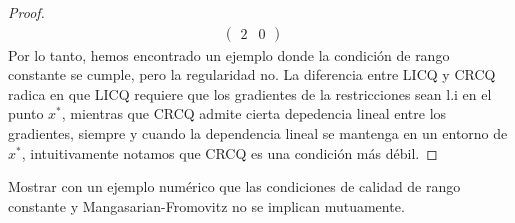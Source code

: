 \documentclass{article}
\newenvironment{theorem}[2][Ejercicio]{\begin{trivlist}
\item[\hskip \labelsep {\bfseries #1}\hskip \labelsep {\bfseries #2.}]}{\end{trivlist}}
\begin{document}
\begin{proof}
\begin{align*}
        \begin{pmatrix}
            2 & 0
        \end{pmatrix} \quad
    \end{align*}
    Por lo tanto, hemos encontrado un ejemplo donde la condición de rango constante se cumple, pero la regularidad no. La diferencia entre LICQ y CRCQ radica en que LICQ requiere que los gradientes de la restricciones sean l.i en el punto \( x^* \),
    mientras que CRCQ admite cierta depedencia lineal entre los gradientes, siempre y cuando la dependencia lineal se mantenga en un entorno de \( x^* \), intuitivamente notamos que CRCQ es una condición más débil.
\end{proof}

\clearpage

\begin{theorem}{8}
    Mostrar con un ejemplo numérico que las condiciones de calidad de rango constante y Mangasarian-Fromovitz no se implican mutuamente.
\end{theorem}
\end{document}
